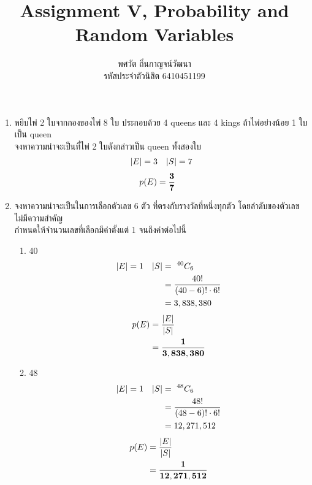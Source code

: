 \documentclass{article}
\title{\textbf{Assignment V, Probability and Random Variables}}
\author{พศวัต ถิ่นกาญจน์วัฒนา \\
รหัสประจำตัวนิสิต 6410451199}
\date{}
\begin{document}
\maketitle

\flushleft
\renewcommand{\labelenumii}{\arabic{enumii})}

\begin{enumerate}

\item{หยิบไพ่ 2 ใบจากกองของไพ่ 8 ใบ ประกอบด้วย 4 queens และ 4 kings ถ้าไพ่อย่างน้อย 1 ใบ เป็น
queen \\
จงหาความน่าจะเป็นที่ไพ่ 2 ใบดังกล่าวเป็น queen ทั้งสองใบ}
\begin{align*}
|E| &= 3 \notag & |S| &= 7 \notag \\
\end{align*}
\begin{equation}
\begin{split}
p(E) &= \mathbf{\frac{3}{7}} \notag
\end{split}
\end{equation}

\item{จงหาความน่าจะเป็นในการเลือกตัวเลข 6 ตัว ที่ตรงกับรางวัลที่หนึ่งทุกตัว โดยลำดับของตัวเลขไม่มีความสำคัญ \\
กำหนดให้จำนวนเลขที่เลือกมีค่าตั้งแต่ 1 จนถึงค่าต่อไปนี้}
	\begin{enumerate}
	
	\item{40}
	\begin{align*}
	|E| &= 1 \notag & |S| &= ~^{40}C_6 \notag \\
	&& &= \frac{40!}{(40 - 6)! \cdot 6!} \\
	&& &= 3,838,380
	\end{align*}
	\begin{equation}
	\begin{split}
	p(E) &= \frac{|E|}{|S|} \notag \\
	&= \mathbf{\frac{1}{3,838,380}}
	\end{split}
	\end{equation}
	
	\item{48}
	\begin{align*}
	|E| &= 1 & |S| &= ~^{48}C_6 \notag \\
	&& &= \frac{48!}{(48 - 6)! \cdot 6!} \\
	&& &= 12,271,512
	\end{align*}
	\begin{equation}
	\begin{split}
	p(E) &= \frac{|E|}{|S|} \notag \\
	&= \mathbf{\frac{1}{12,271,512}}
	\end{split}
	\end{equation}
	

\end{enumerate}
\end{enumerate}
\end{document}
